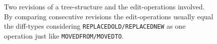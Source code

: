 \begin{figure}[tb]
\caption{\label{fig:diff} Two revisions of a tree-structure and the edit-operations involved. By comparing consecutive revisions the edit-operations usually equal the diff-types considering \texttt{REPLACEDOLD/REPLACEDNEW} as one operation just like \texttt{MOVEDFROM/MOVEDTO}.}
\end{figure} 

